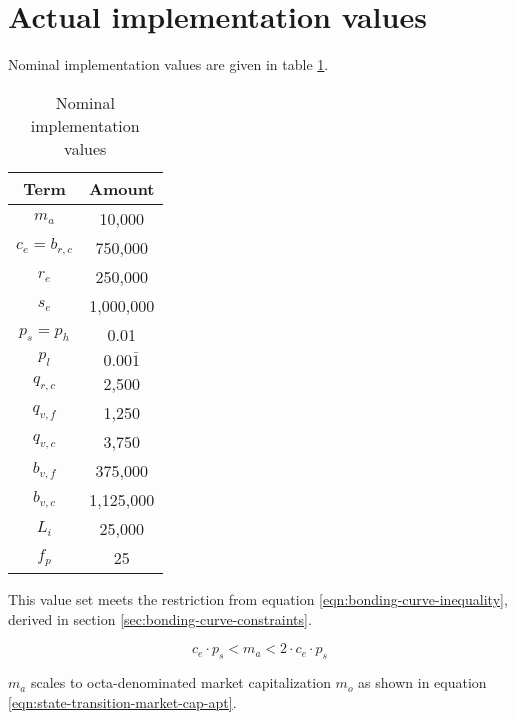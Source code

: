 \documentclass[table, twocolumn]{article}
\begin{document}
\section{Actual implementation values}

Nominal implementation values are given in table
\ref{tab:nominal-implementation-values}.

\begin{table}[!htb]
  \centering
  \begin{tabular}{|c|c|}
    \hline \rowcolor{blue}
    Term            & Amount        \\ \hline
    $m_a$           & 10,000        \\ \hline
    $c_e = b_{r,c}$ & 750,000       \\ \hline
    $r_e$           & 250,000       \\ \hline
    $s_e$           & 1,000,000     \\ \hline
    $p_s = p_h$     & 0.01          \\ \hline
    \rule{0pt}{10pt} %
    $p_l$           & $0.00\bar{1}$ \\ \hline
    $q_{r,c}$       & 2,500         \\ \hline
    $q_{v,f}$       & 1,250         \\ \hline
    $q_{v,c}$       & 3,750         \\ \hline
    $b_{v,f}$       & 375,000       \\ \hline
    $b_{v,c}$       & 1,125,000     \\ \hline
    $L_i$           & 25,000        \\ \hline
    $f_p$           & 25            \\ \hline
  \end{tabular}
  \caption{Nominal implementation values}
  \label{tab:nominal-implementation-values}
\end{table}

This value set meets the restriction from equation \ref{eqn:bonding-curve-inequality},
derived in section \ref{sec:bonding-curve-constraints}.

\begin{equation} \label{eqn:bonding-curve-inequality}
  c_e \cdot p_s < m_a < 2 \cdot c_e \cdot p_s
\end{equation}

$m_a$ scales to octa-denominated \cite{octa} market capitalization $m_o$ as shown in
equation \ref{eqn:state-transition-market-cap-apt}.
\end{document}
